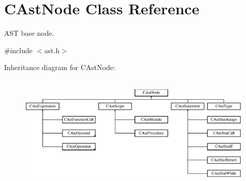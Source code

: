 \hypertarget{classCAstNode}{\section{C\-Ast\-Node Class Reference}
\label{classCAstNode}
}


A\-S\-T base node.  




{\ttfamily \#include $<$ast.\-h$>$}

Inheritance diagram for C\-Ast\-Node\-:\begin{figure}[H]
\begin{center}
\leavevmode
\includegraphics[height=5.536723cm]{classCAstNode}
\end{center}
\end{figure}
